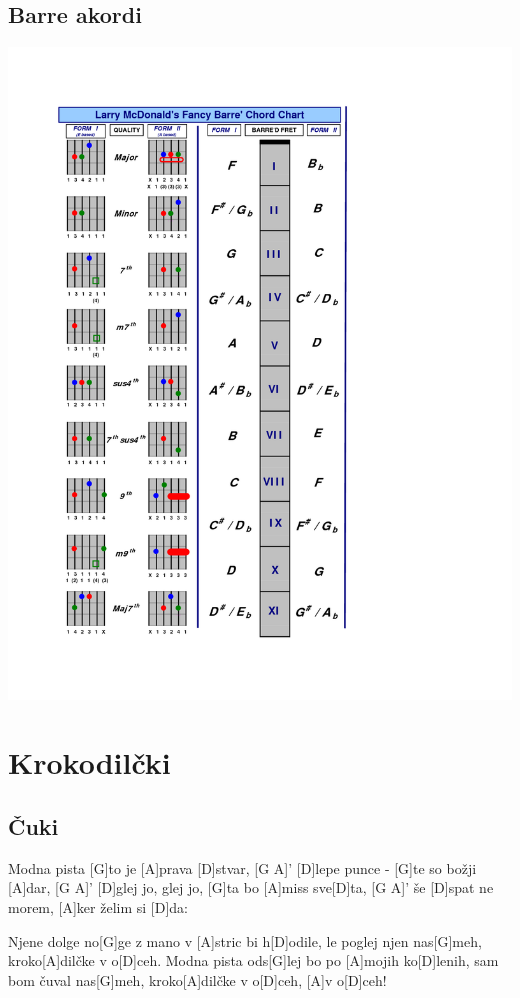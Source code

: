 \documentclass[a4paper,12pt]{article}
\begin{document}
\begin{multicols}{2}
\subsection*{Barre akordi}
\includegraphics[width=140mm]{img/barre.png}
\clearpage
\section{Krokodilčki}
\subsection*{Čuki}
\begin{guitar}
[D]Modna pista [G]to je [A]prava [D]stvar, [G A]'
[D]lepe punce - [G]te so božji [A]dar, [G A]'
[D]glej jo, glej jo, [G]ta bo [A]miss sve[D]ta, [G A]'
še [D]spat ne morem, [A]ker želim si [D]da:


Njene dolge no[G]ge z mano v [A]stric bi h[D]odile,
le poglej njen nas[G]meh, kroko[A]dilčke v o[D]ceh.
Modna pista ods[G]lej bo po [A]mojih ko[D]lenih,
sam bom čuval nas[G]meh, kroko[A]dilčke v o[D]ceh,
[A]v o[D]ceh!



\end{guitar}
\end{multicols}
\end{document}
